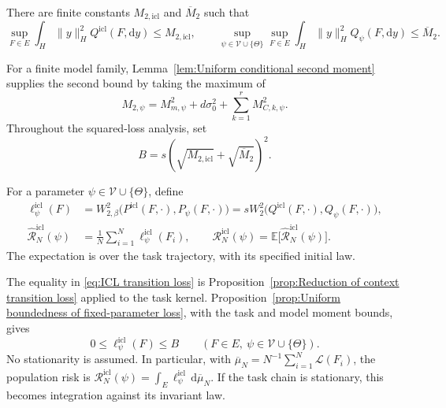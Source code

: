 \begin{assumption}
\label{ass:ICL uniform moments}
There are finite constants \(M_{2,\mathrm{icl}}\) and \(\overline M_2\) such that
\[
\sup_{F\in E}\int_H\|y\|_H^2Q^{\mathrm{icl}}(F,\mathrm dy)
\leqslant M_{2,\mathrm{icl}},
\qquad
\sup_{\psi\in\mathcal V\cup\{\Theta\}}\sup_{F\in E}
\int_H\|y\|_H^2Q_\psi(F,\mathrm dy)
\leqslant\overline M_2.
\]
\end{assumption}

For a finite model family, Lemma~\ref{lem:Uniform conditional second moment} supplies the second bound by taking the maximum of
\[
M_{2,\psi}=M_{m,\psi}^2+d\sigma_0^2+\sum_{k=1}^rM_{C,k,\psi}^2.
\]
Throughout the squared-loss analysis, set
\begin{equation}
\label{eq:ICL loss bound constant}
B=s\left(\sqrt{M_{2,\mathrm{icl}}}+\sqrt{\overline M_2}\right)^2.
\end{equation}

\begin{definition}
\label{def:ICL transition risk}
For a parameter \(\psi\in\mathcal V\cup\{\Theta\}\), define
\begin{align}
\ell_\psi^{\mathrm{icl}}(F)
&=W_{2,\beta}^2\bigl(P^{\mathrm{icl}}(F,\cdot),P_\psi(F,\cdot)\bigr)
=sW_2^2\bigl(Q^{\mathrm{icl}}(F,\cdot),Q_\psi(F,\cdot)\bigr),
\label{eq:ICL transition loss}\\
\widehat{\mathcal R}_N^{\mathrm{icl}}(\psi)
&=\frac1N\sum_{i=1}^N\ell_\psi^{\mathrm{icl}}(F_i),
\qquad
\mathcal R_N^{\mathrm{icl}}(\psi)
=\mathbb E\bigl[\widehat{\mathcal R}_N^{\mathrm{icl}}(\psi)\bigr].
\label{eq:ICL risks}
\end{align}
The expectation is over the task trajectory, with its specified initial law.
\end{definition}

The equality in \eqref{eq:ICL transition loss} is Proposition~\ref{prop:Reduction of context transition loss} applied to the task kernel. Proposition~\ref{prop:Uniform boundedness of fixed-parameter loss}, with the task and model moment bounds, gives
\begin{equation}
\label{eq:ICL bounded losses}
0\leqslant\ell_\psi^{\mathrm{icl}}(F)\leqslant B
\qquad(F\in E,\ \psi\in\mathcal V\cup\{\Theta\}).
\end{equation}
No stationarity is assumed. In particular, with
\(\overline\mu_N=N^{-1}\sum_{i=1}^N\mathcal L(F_i)\), the population risk is \(\mathcal R_N^{\mathrm{icl}}(\psi)=\int_E\ell_\psi^{\mathrm{icl}}\,\mathrm d\overline\mu_N\). If the task chain is stationary, this becomes integration against its invariant law.

